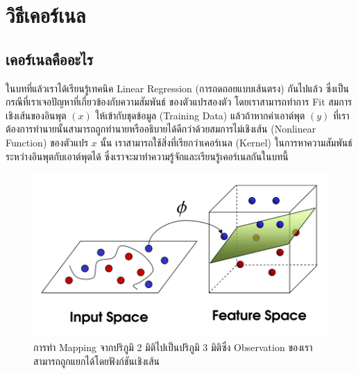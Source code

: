 

\chapter{วิธีเคอร์เนล}
\label{ch:kernel}

\section{เคอร์เนลคืออะไร}
\label{sec:kernel}

ในบทที่แล้วเราได้เรียนรู้เทคนิค Linear Regression (การถดถอยแบบเส้นตรง) กันไปแล้ว ซึ่งเป็นกรณีที่เราเจอปัญหาที่เกี่ยวข้องกับความสัมพันธ์%
ของตัวแปรสองตัว โดยเราสามารถทำการ Fit สมการเชิงเส้นของอินพุต $(x)$ ให้เข้ากับชุดข้อมูล (Training Data) แล้วถ้าหากค่าเอาต์พุต 
$(y)$ ที่เราต้องการทำนายนั้นสามารถถูกทำนายหรืออธิบายได้ดีกว่าด้วยสมการไม่เชิงเส้น (Nonlinear Function) ของตัวแปร $x$ นั้น 
เราสามารถใช้สิ่งที่เรียกว่าเคอร์เนล (Kernel) ในการหาความสัมพันธ์ระหว่างอินพุตกับเอาต์พุตได้ ซึ่งเราจะมาทำความรู้จักและเรียนรู้เคอร์เนลกันในบทนี้ 

\begin{figure}[htbp]
    \centering
    \includegraphics[width=0.8\linewidth]{fig/2d_to_3d_spaces.png}
    \caption{การทำ Mapping จากปริภูมิ 2 มิติไปเป็นปริภูมิ 3 มิติซึ่ง Observation ของเราสามารถถูกแยกได้โดยฟังก์ชันเชิงเส้น}
    \label{fig:2d_to_3d}
\end{figure}

